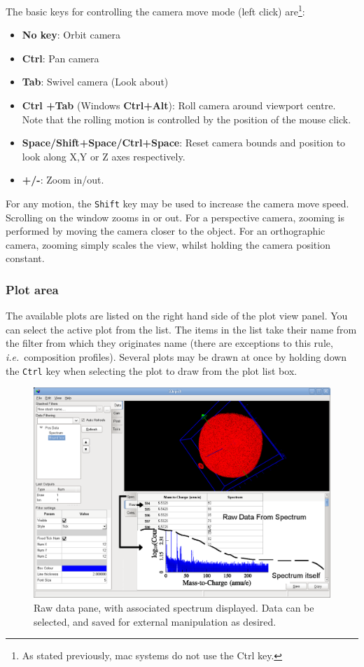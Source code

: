 \documentclass[10pt]{article}
\begin{document}
The basic keys for controlling the camera move mode (left click) are\footnote{As stated previously, mac systems do not use the Ctrl key.}:  
\begin{itemize}
\item  \textbf{No key}: Orbit camera 
\item \textbf{Ctrl}: Pan camera 
\item  \textbf{Tab}: Swivel camera (Look about)
\item  \textbf{Ctrl +Tab} (Windows \textbf{Ctrl+Alt}): Roll camera around viewport centre. Note that the rolling motion is controlled by the position of the mouse click.
\item \textbf{Space/Shift+Space/Ctrl+Space}: Reset camera bounds and position to look along X,Y or Z axes respectively.
\item \textbf{+/-}: Zoom in/out.

\end{itemize}
For any motion, the \texttt{Shift} key may be used to increase the camera move speed.  Scrolling on the window zooms in or out. For a perspective camera, zooming is performed by moving the camera closer to the object. For an orthographic camera, zooming simply scales the view, whilst holding the camera position constant.


\subsubsection{Plot area}
The available plots are listed on the right hand side of the plot view panel. You can select the active plot from the list. The items in the list take their name from the filter from which they originates name (there are exceptions to this rule, \emph{i.e.}\ composition profiles). Several plots may be drawn at once by holding down the \texttt{Ctrl} key when selecting the plot to draw from the plot list box.  


\begin{figure}[ht]
\centering
 \includegraphics[width=0.85 \textwidth,keepaspectratio=true]{./figures/spectrum-raw.png}

 \caption{Raw data pane, with associated spectrum displayed. Data can be selected, and saved for external manipulation as desired.}
\label{fig:raw-basics}
\end{figure}
\end{document}
